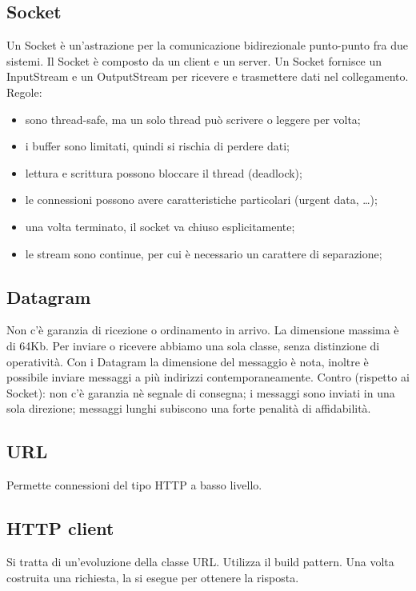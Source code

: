 \documentclass{article}
\begin{document}
\subsection{Socket}
Un Socket è un'astrazione per la comunicazione bidirezionale punto-punto fra due
sistemi. Il Socket è composto da un client e un server. Un Socket fornisce un
InputStream e un OutputStream per ricevere e trasmettere dati nel collegamento.
Regole:
\begin{itemize}
	\item sono thread-safe, ma un solo thread può scrivere o leggere per volta;

	\item i buffer sono limitati, quindi si rischia di perdere dati;

	\item lettura e scrittura possono bloccare il thread (deadlock);

	\item le connessioni possono avere caratteristiche particolari (urgent data,
		\dots);

	\item una volta terminato, il socket va chiuso esplicitamente;

	\item le stream sono continue, per cui è necessario un carattere di
		separazione;
\end{itemize}

\subsection{Datagram}
Non c'è garanzia di ricezione o ordinamento in arrivo. La dimensione massima è
di 64Kb. Per inviare o ricevere abbiamo una sola classe, senza distinzione di
operatività. Con i Datagram la dimensione del messaggio è nota, inoltre è
possibile inviare messaggi a più indirizzi contemporaneamente. Contro (rispetto
ai Socket): non c'è garanzia nè segnale di consegna; i messaggi sono inviati in
una sola direzione; messaggi lunghi subiscono una forte penalità di
affidabilità.

\subsection{URL}
Permette connessioni del tipo HTTP a basso livello.

\subsection{HTTP client}
Si tratta di un'evoluzione della classe URL. Utilizza il build pattern. Una
volta costruita una richiesta, la si esegue per ottenere la risposta.
\end{document}
